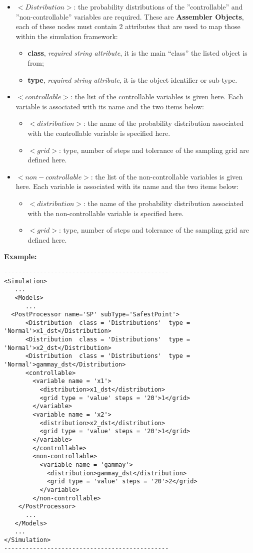 \begin{itemize}
	\item $<Distribution>$: the probability distributions of the ''controllable'' and ''non-controllable'' variables are required. These are \textbf{Assembler Objects}, each of these nodes must contain 2 attributes that are used to map those within the simulation framework:
   		\begin{itemize}
     			\item \textbf{class}, \textit{required string attribute}, it is the main ``class'' the listed object is from;
	     		\item \textbf{type},  \textit{required string attribute}, it is the object identifier or sub-type.
		\end{itemize}
	\item $<controllable>$: the list of the controllable variables is given here. Each variable is associated with its name and the two items below:
		\begin{itemize}
			\item $<distribution>$: the name of the probability distribution associated with the controllable variable is specified here.
			\item $<grid>$: type, number of steps and tolerance of the sampling grid are defined here.
		\end{itemize}
	\item $<non-controllable>$: the list of the non-controllable variables is given here. Each variable is associated with its name and the two items below:
		\begin{itemize}
			\item $<distribution>$: the name of the probability distribution associated with the non-controllable variable is specified here.
			\item $<grid>$: type, number of steps and tolerance of the sampling grid are defined here.
		\end{itemize}
\end{itemize}

\textbf{Example:}
\begin{lstlisting}[style=XML]
----------------------------------------------
<Simulation>
   ...
   <Models>
      ...
  <PostProcessor name='SP' subType='SafestPoint'>
      <Distribution  class = 'Distributions'  type = 'Normal'>x1_dst</Distribution>
      <Distribution  class = 'Distributions'  type = 'Normal'>x2_dst</Distribution>
      <Distribution  class = 'Distributions'  type = 'Normal'>gammay_dst</Distribution>
      <controllable>
        <variable name = 'x1'>
          <distribution>x1_dst</distribution>
          <grid type = 'value' steps = '20'>1</grid>   		
        </variable>
        <variable name = 'x2'>
          <distribution>x2_dst</distribution>
          <grid type = 'value' steps = '20'>1</grid>   		
        </variable>
        </controllable>
        <non-controllable>
          <variable name = 'gammay'>
            <distribution>gammay_dst</distribution>
            <grid type = 'value' steps = '20'>2</grid>
          </variable> 	
        </non-controllable>
    </PostProcessor>
      ...
   </Models>
   ...
</Simulation>
----------------------------------------------
\end{lstlisting}
